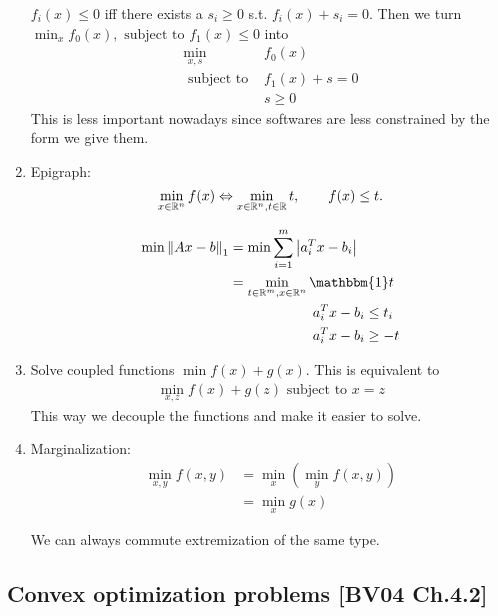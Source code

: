 \documentclass[class=article,crop=false]{standalone}
\begin{document}
\begin{enumerate}[label=\arabic*)]
		$ f_i(x) \leq 0$ iff there exists a  $ s_i \geq 0$ s.t. $ f_i(x) + s_i =0$.
		Then we turn $ \min_x f_0(x), \text{ subject to }  f_1(x) \leq 0$ into
		\begin{align*}
			\min_{x,s}\ &f_0(x)\\
				   \text{ subject to }  &f_1(x) + s= 0\\ 
				    &s\geq 0
		\end{align*}
		This is less important nowadays since softwares are less constrained by the form we give them.
	\item Epigraph:
		\[
			\min_{x \in \mathbb{R}^{n}} f(x) \Leftrightarrow \min_{x \in \mathbb{R}^{n}, t \in \mathbb{R}} t, \qquad  f(x) \leq t
		.\] 
		\begin{eg}
			\begin{align*}
		\min \norm{ Ax -b}_1 &= \min \sum_{ i= 1}^{ m} \left| a_i^{T} x - b_i \right|  \\ 
				     &= \min_{t \in \rr^{m}, x \in \rr^{n}} \mathbbm{1} t\\ 
				     & \qquad \qquad \qquad  a_i^{T}x - b_i \leq t_i\\
				     & \qquad \qquad \qquad  a_i^{T} x - b_i \geq -t
			\end{align*} 
		\end{eg}
	\item Solve coupled functions $ \min f(x) +g(x)$. This is equivalent to
		\begin{align*}
			\min_{x,z} f(x) + g(z) \text{ subject to }  x=z
		\end{align*}
		This way we decouple the functions and make it easier to solve.
	\item Marginalization:
		\begin{align*}
			\min_{x,y} f(x,y) &= \min_x \left( \min_y f(x,y) \right)  \\
					   &= \min_x g(x)
		\end{align*}
		\begin{note}
		We can always commute extremization of the same type.
		\end{note}
\end{enumerate}

\subsection{Convex optimization problems [BV04 Ch.4.2]}
\end{document}
